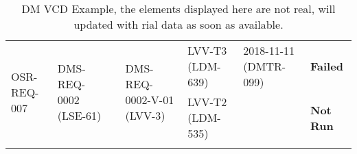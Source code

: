 \begin{longtable}[]{|p{1.5cm}|p{2.7cm}|p{1.5cm}|p{3.2cm}|p{1.5cm}|p{1.7cm}|p{1.5cm}|}
\multirow{2}{*}{
\tiny OSR-REQ-007} &
\multirow{2}{*}{
\begin{minipage}[t]{0.9\columnwidth}
{\small DMS-REQ-0002}\newline
{\scriptsize (LSE-61)}
\end{minipage}} &
\multirow{2}{*}{} &
\multirow{2}{*}{
\begin{minipage}[t]{0.9\columnwidth}
{\small DMS-REQ-0002-V-01}\newline
{\scriptsize (LVV-3)}
\end{minipage}} &
\begin{minipage}[t]{0.9\columnwidth}
{\small LVV-T3}\newline
{\scriptsize (LDM-639)}
\end{minipage} &
\begin{minipage}[t]{0.9\columnwidth}
{\small 2018-11-11}\newline
{\scriptsize (DMTR-099)}
\end{minipage} &
{\small \bf Failed} \\ \cline{5-7}
 & & & &
\begin{minipage}[t]{0.9\columnwidth}
{\small LVV-T2}\newline
{\scriptsize (LDM-535)}
\end{minipage} &
 &
{\small \bf Not Run}
\\\hline

\caption{DM VCD Example, the elements displayed here are not real, will updated with rial data as soon as available.}
\label{tab:dmvcd}
\end{longtable}

